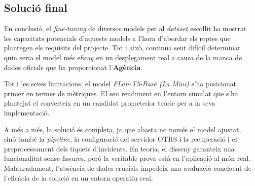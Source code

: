 \subsection{Solució final}
En conclusió, el \textit{fine-tuning} de diversos models per al \textit{dataset} escollit ha mostrat les capacitats potencials d'aquests models a l'hora d'abordar els reptes que plantegen els requisits del projecte. Tot i això, continua sent difícil determinar quin seria el model més eficaç en un desplegament real a causa de la manca de dades oficials que ha proporcionat l'\textbf{Agència}.

Tot i les seves limitacions, el model \textit{FLan-T5-Base (La Mini)} s'ha posicionat primer en termes de mètriques. El seu rendiment en l'entorn simulat que s'ha plantejat el converteix en un candidat prometedor teòric per a la seva implementació. 

A més a més, la solució és completa, ja que abasta no només el model ajustat, sinó també la \textit{pipeline}, la configuració del servidor OTRS i la recuperació i el preprocessament dels tiquets d'incidents. En teoria, el disseny garanteix una funcionalitat sense fissures, però la veritable prova està en l'aplicació al món real. Malauradament, l'absència de dades crucials impedeix una avaluació concloent de l'eficàcia de la solució en un entorn operatiu real.
